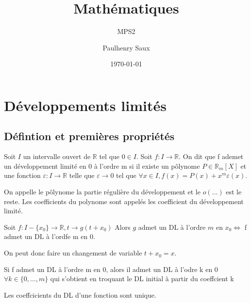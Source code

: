 \documentclass[french]{yLectureNote}
\title{Mathématiques}
\subtitle{MPS2}
\author{Paulhenry Saux}
\date{\today}
\newcommand{\R}[0]{\mathbb{R}}
\begin{document}

	\chapter{Développements limités}
\section{Défintion et premières propriétés}
\begin{definition}
Soit $I$ un intervalle ouvert de \(\R\) tel que \(0\in I\). Soit \(f:I\to \R\). On dit que f ademet un développement limité en 0 à l'ordre m si il existe un p\^olynome \(P\in\R_m[X]\) et une fonction \(\varepsilon : I\to \R\) telle que \(\varepsilon \to 0\) tel que \(\forall x\in I, f(x) = P(x) + x^m\varepsilon(x)\).
\end{definition}
On appelle le p\^olynome la partie régulière du développement et le \(o(\dots)\) est le reste. Les coefficients du polynome sont appelés les coefficient du développement limité.
\begin{definition}[En $x\neq 0$]
Soit \(f : I-\{x_0\} \to \R, t\to g(t+x_0)\) Alors \(g\) admet un DL à l'ordre $m$ en $x_0 \iff$ f admet un DL à l'ordfe m en 0.
\end{definition}
On peut donc faire un changement de variable $t+x_0 = x$.
\begin{lemma}
Si f admet un DL à l'ordre m en 0, alors il admet un DL à l'odre k en 0 \(\forall k \in \{0,\dots,m\}\) qui s'obtient en troquant le DL initial à partir du coeffcient k
\end{lemma}

\begin{theorem}[Unicité du DL]
 Les coeffcicients du DL d'une fonction sont unique.
\end{theorem}
\end{document}

